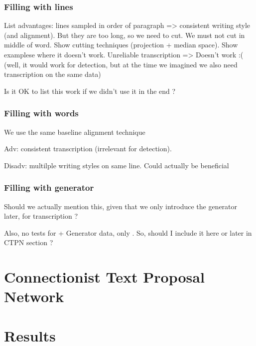 
		\subsubsection{Filling with lines}
		\startToDo
			List advantages: lines sampled in order of paragraph => consistent writing style (and alignment). But they are too long, so we need to cut. We must not cut in middle of word. Show cutting techniques (projection + median space). Show examplese where it doesn't work. Unreliable transcription => Doesn't work :( (well, it would work for detection, but at the time we imagined we also need transcription on the same data)

			Is it OK to list this work if we didn't use it in the end ?
		\stopToDo

		\subsubsection{Filling with words}
		\startToDo
			We use the same baseline alignment technique

			Adv: consistent transcription (irrelevant for detection).

			Disadv: multilple writing styles on same line. Could actually be beneficial
		\stopToDo


		\subsubsection{Filling with generator}
		\startToDo
			Should we actually mention this, given that we only introduce the generator later, for transcription ?

			Also, no tests for \FRCNN{} + Generator data, only \CTPN{}. So, should I include it here or later in CTPN section ?
		\stopToDo






\section{Connectionist Text Proposal Network}\label{sec:ctpn}




\section{Results}\label{sec:detection_results}


